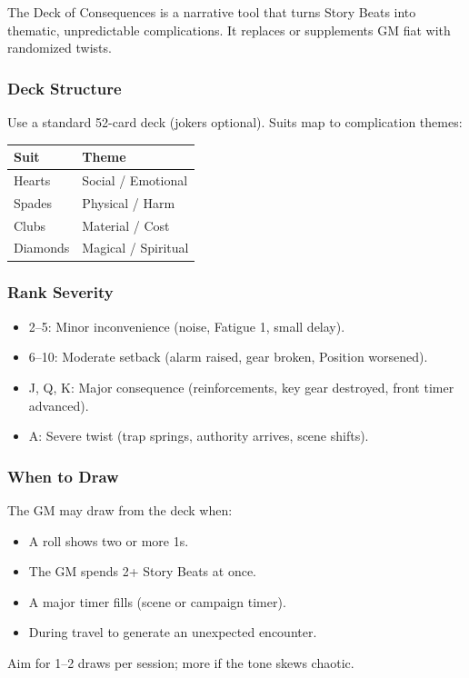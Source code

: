 The Deck of Consequences is a narrative tool that turns Story Beats into thematic, unpredictable complications. It replaces or supplements GM fiat with randomized twists.

\subsubsection{Deck Structure}
Use a standard 52-card deck (jokers optional). Suits map to complication themes:

\begin{tabular}{@{}ll@{}}
\toprule
\textbf{Suit} & \textbf{Theme} \\
\midrule
Hearts   & Social / Emotional \\
Spades   & Physical / Harm \\
Clubs    & Material / Cost \\
Diamonds & Magical / Spiritual \\
\bottomrule
\end{tabular}

\subsubsection{Rank Severity}
\begin{itemize}
  \item 2–5: Minor inconvenience (noise, Fatigue 1, small delay).
  \item 6–10: Moderate setback (alarm raised, gear broken, Position worsened).
  \item J, Q, K: Major consequence (reinforcements, key gear destroyed, front timer advanced).
  \item A: Severe twist (trap springs, authority arrives, scene shifts).
\end{itemize}

\subsubsection{When to Draw}
The GM may draw from the deck when:
\begin{itemize}
  \item A roll shows two or more 1s.
  \item The GM spends 2+ Story Beats at once.
  \item A major timer fills (scene or campaign timer).
  \item During travel to generate an unexpected encounter.
\end{itemize}
Aim for 1–2 draws per session; more if the tone skews chaotic.

